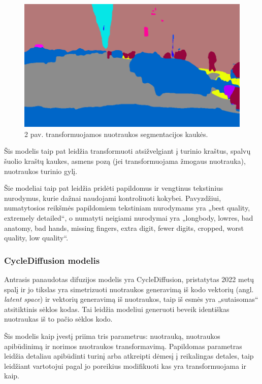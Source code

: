 \documentclass{VUMIFPSbakalaurinis}
\begin{document}
            \begin{figure}[H]
                \centering
                \includegraphics[scale=0.4287]{img/diffusion/controlnet/mask}
                \caption{2 pav. transformuojamos nuotraukos segmentacijos kaukės.}
                \label{img:mlp}
            \end{figure}

            Šis modelis taip pat leidžia transformuoti atsižvelgiant į turinio kraštus, spalvų šuolio kraštų kaukes, asmens pozą (jei transformuojama žmogaus nuotrauka), nuotraukos turinio gylį.

            Šie modeliai taip pat leidžia pridėti papildomus ir vengtinus tekstinius nurodymus, kurie dažnai naudojami kontroliuoti kokybei. Pavyzdžiui, numatytosios reikšmės papildomiem tekstiniam nurodymams yra „best quality, extremely detailed“, o numatyti neigiami nurodymai yra „longbody, lowres, bad anatomy, bad hands, missing fingers, extra digit, fewer digits, cropped, worst quality, low quality“.
        \subsubsection{CycleDiffusion modelis}
            Antrasis panaudotas difuzijos modelis yra CycleDiffusion, pristatytas 2022 metų spalį ir jo tikslas yra simetrizuoti nuotraukos generavimą iš kodo vektorių (angl. \emph{latent space}) ir vektorių generavimą iš nuotraukos, taip iš esmės yra „sutaisomas“ atsitiktinis sėklos kodas. Tai leidžia modeliui generuoti beveik identiškas nuotraukas iš to pačio sėklos kodo.

            Šis modelis kaip įvestį priima tris parametrus: nuotrauką, nuotraukos apibūdinimą ir norimos nuotraukos transformavimą. Papildomas parametras leidžia detaliau apibūdinti turinį arba atkreipti dėmesį į reikalingas detales, taip leidžiant vartotojui pagal jo poreikius modifikuoti kas yra transformuojama ir kaip.
\end{document}
